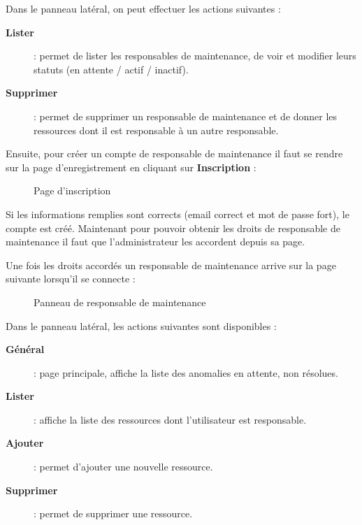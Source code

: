 Dans le panneau latéral, on peut effectuer les actions suivantes :
\begin{description}
    \item[\textbf{Lister}] : permet de lister les responsables de maintenance, de voir et modifier
        leurs statuts (en attente / actif / inactif).
    \item[\textbf{Supprimer}] : permet de supprimer un responsable de maintenance et de donner les
        ressources dont il est responsable à un autre responsable.
\end{description}
\medskip

Ensuite, pour créer un compte de responsable de maintenance il faut se rendre sur la page
d'enregistrement en cliquant sur \textbf{Inscription} :
\begin{figure}[h]
    \centering
    \caption{Page d'inscription}
\end{figure}

Si les informations remplies sont corrects (email correct et mot de passe fort), le compte est
créé. Maintenant pour pouvoir obtenir les droits de responsable de maintenance il faut que
l'administrateur les accordent depuis sa page.\newline

Une fois les droits accordés un responsable de maintenance arrive sur la page suivante lorsqu'il
se connecte :
\begin{figure}[h]
    \centering
    \caption{Panneau de responsable de maintenance}
\end{figure}

Dans le panneau latéral, les actions suivantes sont disponibles :
\begin{description}
    \item[\textbf{Général}] : page principale, affiche la liste des anomalies en attente, non
        résolues.
    \item[\textbf{Lister}] : affiche la liste des ressources dont l'utilisateur est responsable.
    \item[\textbf{Ajouter}] : permet d'ajouter une nouvelle ressource.
    \item[\textbf{Supprimer}] : permet de supprimer une ressource.
\end{description}




